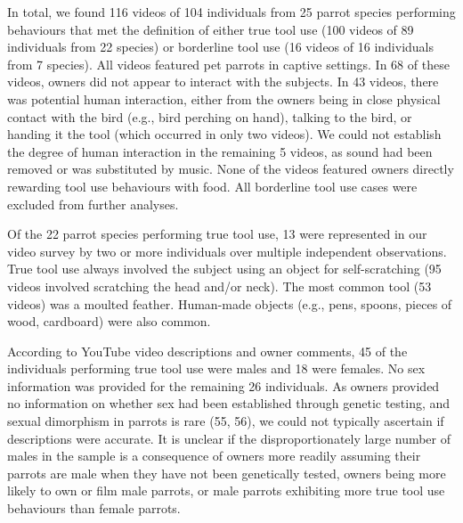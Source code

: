 \documentclass[
  man,floatsintext]{apa6}
\begin{document}
In total, we found 116 videos of
104 individuals from
25
parrot species performing behaviours that met the definition of either true tool
use (100 videos of
89
individuals from
22
species) or borderline tool use (16 videos of
16
individuals from
7
species). All videos featured pet parrots in captive settings. In
68 of these
videos, owners did not appear to interact with the subjects. In
43 videos,
there was potential human interaction, either from the owners being in close physical
contact with the bird (e.g., bird perching on hand), talking to the bird, or
handing it the tool (which occurred in only two videos). We could not establish
the degree of human interaction in the remaining
5
videos, as sound had been removed or was substituted by music. None of the
videos featured owners directly rewarding tool use behaviours with food. All
borderline tool use cases were excluded from further analyses.

Of the 22
parrot species performing true tool use,
13
were represented in our video survey by two or more individuals over multiple
independent observations. True tool use always involved the subject using an
object for self-scratching (95
videos involved scratching the head and/or neck). The most common tool (53
videos) was a moulted feather. Human-made objects (e.g., pens, spoons, pieces of
wood, cardboard) were also common.

According to YouTube video descriptions and owner comments,
45
of the individuals performing true tool use were males and
18
were females. No sex information was provided for the remaining
26
individuals. As owners provided no information on whether sex had been
established through genetic testing, and sexual dimorphism in parrots is
rare (55, 56), we could not typically ascertain if descriptions
were accurate. It is unclear if the disproportionately large number of males in
the sample is a consequence of owners more readily assuming their parrots are
male when they have not been genetically tested, owners being more likely to own
or film male parrots, or male parrots exhibiting more true tool use behaviours
than female parrots.
\end{document}
